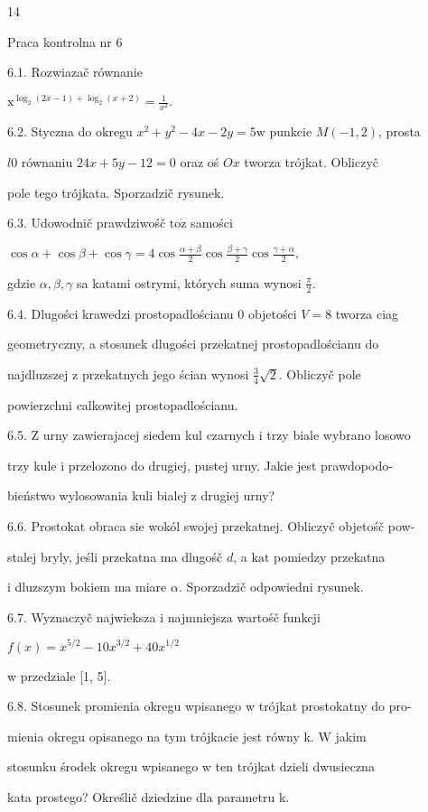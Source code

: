 \documentclass[a4paper,12pt]{article}
\begin{document}
14

Praca kontrolna nr 6

6.1. Rozwiazač równanie

$\displaystyle \mathrm{x}^{\log_{2}(2x-1)+\log_{2}(x+2)}=\frac{1}{x^{2}}.$

6.2. Styczna do okregu $x^{2}+y^{2}-4x-2y=5\mathrm{w}$ punkcie $M(-1,2)$, prosta

$l0$ równaniu $24x+5y-12=0$ oraz oś $Ox$ tworza trójkat. Obliczyč

pole tego trójkata. Sporzadzič rysunek.

6.3. Udowodnič prawdziwośč $\mathrm{t}\mathrm{o}\dot{\mathrm{z}}$ samości

$\displaystyle \cos\alpha+\cos\beta+\cos\gamma=4\cos\frac{\alpha+\beta}{2}\cos\frac{\beta+\gamma}{2}\cos\frac{\gamma+\alpha}{2},$

gdzie $\alpha, \beta, \gamma$ sa katami ostrymi, których suma wynosi $\displaystyle \frac{\pi}{2}.$

6.4. Dlugości krawedzi prostopadlościanu $0$ objetości $V = 8$ tworza ciag

geometryczny, a stosunek dlugości przekatnej prostopadlościanu do

najdluzszej $\mathrm{z}$ przekatnych jego ścian wynosi $\displaystyle \frac{3}{4}\sqrt{2}$. Obliczyč pole

powierzchni calkowitej prostopadlościanu.

6.5. $\mathrm{Z}$ urny zawierajacej siedem kul czarnych $\mathrm{i}$ trzy biale wybrano losowo

trzy kule $\mathrm{i}$ przelozono do drugiej, pustej urny. Jakie jest prawdopodo-

bieństwo wylosowania kuli bialej $\mathrm{z}$ drugiej urny?

6.6. Prostokat obraca $\mathrm{s}\mathrm{i}\mathrm{e}$ wokól swojej przekatnej. Obliczyč objetośč pow-

stalej bryly, jeśli przekatna ma dlugośč $d$, a $\mathrm{k}\mathrm{a}\mathrm{t}$ pomiedzy przekatna

$\mathrm{i}$ dluzszym bokiem ma miare $\alpha$. Sporzadzič odpowiedni rysunek.

6.7. Wyznaczyč najwieksza $\mathrm{i}$ najmniejsza wartośč funkcji

$f(x)=x^{5/2}-10x^{3/2}+40x^{1/2}$

w przedziale [1, 5].

6.8. Stosunek promienia okregu wpisanego w trójkat prostokatny do pro-

mienia okregu opisanego na tym trójkacie jest równy k. W jakim

stosunku środek okregu wpisanego w ten trójkat dzieli dwusieczna

kata prostego? Określič dziedzine dla parametru k.
\end{document}
